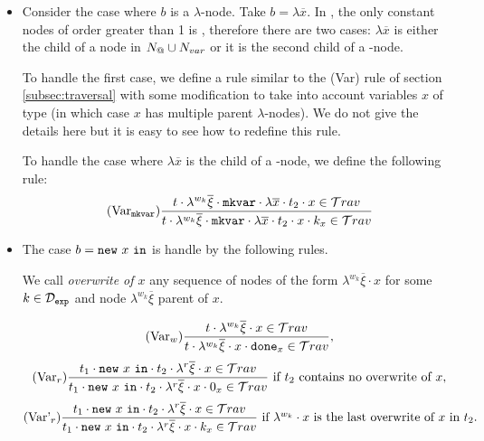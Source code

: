 \begin{itemize}
\begin{itemize}
\item Consider the case where $b$ is a $\lambda$-node. Take $b = \lambda \overline{x}$.
In \ialgol, the only constant nodes of order greater than 1 is
\iamkvar, therefore there are two cases: $\lambda \overline{x}$ is
either the child of a node in $N_@ \cup N_{var}$ or it is the
second child of a \iamkvar-node.

To handle the first case, we define a rule similar to the (Var) rule
of section \ref{subsec:traversal} with some modification to take
into account variables $x$ of type \iavar (in which case $x$ has
multiple parent $\lambda$-nodes). We do not give the details here
but it is easy to see how to redefine this rule.

To handle the case where $\lambda \overline{x}$ is the child of a
\iamkvar-node, we define the following rule:
$$ (\mbox{Var}_{\texttt{mkvar}})  \frac{\displaystyle t \cdot \lambda^{w_k} \overline{\xi} \cdot \texttt{mkvar} \cdot \lambda \overline{x} \cdot t_2 \cdot x \in \mathcal{T}rav}{t \cdot \lambda^{w_k} \overline{\xi} \cdot \texttt{mkvar} \cdot \lambda
\overline{x} \cdot t_2 \cdot x \cdot k_{x} \in \mathcal{T}rav }
$$

\item The case $b = \texttt{new}\ x\ \texttt{in}$ is handle by the following rules.

We call \emph{overwrite of $x$} any sequence of nodes of the form
$\lambda^{w_k}\overline{\xi} \cdot x$ for some $k\in
\mathcal{D}_{\texttt{exp}}$ and node $\lambda^{w_k}\overline{\xi}$ parent
of $x$.

$$(\mbox{Var}_w) \frac{\displaystyle t \cdot \lambda^{w_k} \overline{\xi} \cdot x \in \mathcal{T}rav}{t \cdot \lambda^{w_k} \overline{\xi} \cdot x \cdot \texttt{done}_x \in \mathcal{T}rav },$$
$$(\mbox{Var}_r) \frac{\displaystyle t_1 \cdot \texttt{new}\ x\ \texttt{in} \cdot t_2 \cdot \lambda^r \overline{\xi} \cdot x \in \mathcal{T}rav}{t_1 \cdot \texttt{new}\ x\ \texttt{in} \cdot t_2 \cdot \lambda^r \overline{\xi} \cdot x \cdot 0_x \in \mathcal{T}rav }
\mbox{ if $t_2$ contains no overwrite of $x$},$$
$$(\mbox{Var'}_r) \frac{\displaystyle t_1 \cdot \texttt{new}\ x\ \texttt{in} \cdot t_2 \cdot \lambda^r \overline{\xi} \cdot x \in \mathcal{T}rav}{t_1 \cdot \texttt{new}\ x\ \texttt{in} \cdot t_2 \cdot \lambda^r \overline{\xi} \cdot x \cdot k_x \in \mathcal{T}rav }
\mbox{ if $\lambda^{w_k} \cdot x$ is the last overwrite of $x$ in }
t_2.$$
\end{itemize}
\end{itemize}

